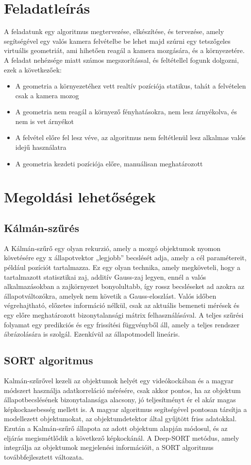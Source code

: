 \section{Feladatleírás}

A feladatunk egy algoritmus megtervezése, elkészítése, és tervezése, amely segítségével egy valós kamera felvételbe be lehet majd szúrni egy tetszőgeles virtuális geometriát, ami hihetően reagál a kamera mozgására, és a környezetére.
A feladat nehézsége miatt számos megszorítással, és feltétellel fogunk dolgozni, ezek a következőek:

\begin{itemize}
	\item A geometria a környezetéhez vett realtív pozíciója statikus, tahát a felvételen csak a kamera mozog
	\item A geometria nem reagál a környező fényhatásokra, nem lesz árnyékolva, és nem is vet árnyékot
	\item A felvétel előre fel lesz véve, az algoritmus nem feltétlenül lesz alkalmas valós idejű használatra
	\item A geometria kezdeti pozíciója előre, manuálisan meghatározott
\end{itemize}

\section{Megoldási lehetőségek}

\subsection{Kálmán-szűrés}
A Kálmán-szűrő egy olyan rekurzió, amely a mozgó objektumok nyomon követésére egy x állapotvektor „legjobb” becslését adja, amely a cél paramétereit, például pozíciót tartalmazza. Ez egy olyan technika, amely megköveteli, hogy a tartalmazott statisztikai zaj, additív Gauss-zaj legyen, ennél a valós alkalmazásokban a zajkörnyezet bonyolultabb, így rossz becsléseket ad azokra az állapotváltozókra, amelyek nem követik a Gauss-eloszlást. Valós időben végrehajtható, előzetes információ nélkül, csak az aktuális bemeneti mérések és egy előre meghatározott bizonytalansági mátrix felhasználásával. A teljes szűrési folyamat egy predikciós és egy frissítési függvényből áll, amely a teljes rendszer ábrázolására is szolgál. Ezenkívül az állapotmodell lineáris.

\subsection{SORT algoritmus}
Kalmán-szűrővel kezeli az objektumok helyét egy videókockában és a magyar módszert használja adatkorreláció mérésére, csak akkor pontos, ha az objektum állapotbecslésének bizonytalansága alacsony, jó teljesítményt ér el akár magas képkockasebesség mellett is. A magyar algoritmus segítségével pontosan társítja a modellezett objektumokat, az objektumdetektor által gyűjtött friss adatokkal. Ezután a Kalmán-szűrő állapota az adott objektum alapján módosul, és az eljárás megismétlődik a következő képkockánál. A Deep-SORT metódus, amely integrálja az objektumok megjelenési információit, a SORT algoritmus továbbfejlesztett változata.

